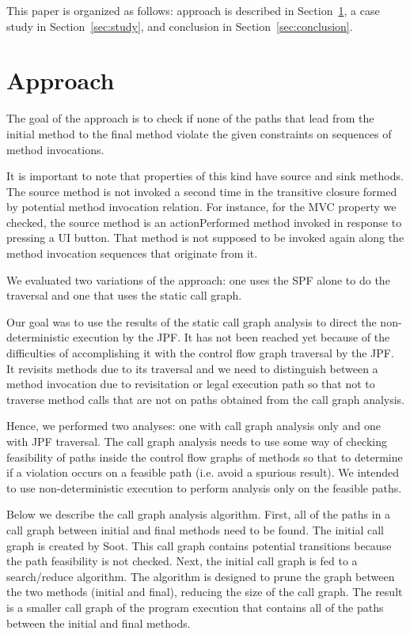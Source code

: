 \documentclass{acm_proc_article-sp}
\begin{document}
This paper is organized as follows: approach is described in
Section~\ref{sec:approach}, a case study in Section~\ref{sec:study},
and conclusion in Section~\ref{sec:conclusion}.


\section{Approach}
\label{sec:approach}
The goal of the approach is to check if none of the paths that lead
from the initial method to the final method violate the given
constraints on sequences of method invocations. 

It is important to note that properties of this kind have source and sink
methods. The source method is not invoked a second time in the transitive closure formed by potential method invocation
relation. For instance, for the MVC property we checked, the source method is an actionPerformed method invoked in response to
pressing a UI button. That method is not supposed to be invoked again along the method invocation sequences that originate from it. 

We evaluated two variations of the approach: one uses the SPF alone to do the traversal and one that uses the static call graph.

Our goal was to use the results of the static call graph analysis to direct the non-deterministic execution by the JPF.
It has not been reached yet because of the difficulties of accomplishing it with the control flow graph traversal by the JPF. It revisits methods due to its traversal and we need to distinguish between a method invocation due to revisitation or
legal execution path so that not to traverse method calls that are not on paths obtained from the call graph analysis.

Hence, we performed two analyses: one with call graph analysis only and one with JPF traversal.
The call graph analysis needs to use some way of checking feasibility of paths inside the control flow graphs of methods so that to determine if a violation occurs on a feasible path (i.e. avoid a spurious result).
We intended to use non-deterministic execution to perform analysis only on the feasible paths.

Below we describe the call graph analysis algorithm.
First, all of the
paths in a call graph between initial and final methods need to be
found.  The initial call graph is created by Soot. This call graph
contains potential transitions because the path feasibility is not
checked.  Next, the initial call graph is fed to a search/reduce
algorithm. The algorithm is designed to prune the graph between the
two methods (initial and final), reducing the size of the call graph.
The result is a smaller call graph of the program execution that
contains all of the paths between the initial and final methods.
\end{document}
